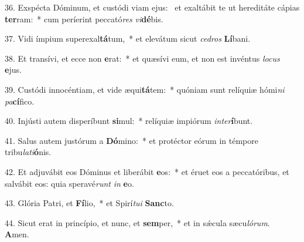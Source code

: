 36. Exspécta Dóminum, et custódi viam ejus: \dag\  et exaltábit te ut hereditáte cápias \textbf{ter}ram:~*  cum períerint peccató\textit{res} \textit{vi}\textbf{dé}bis.\

37. Vidi ímpium superexal\textbf{tá}tum,~*  et elevátum sicut \textit{ce}\textit{dros} \textbf{Lí}bani.\

38. Et transívi, et ecce non \textbf{e}rat:~*  et quæsívi eum, et non est invéntus \textit{lo}\textit{cus} \textbf{e}jus.\

39. Custódi innocéntiam, et vide æqui\textbf{tá}tem:~*  quóniam sunt relíquiæ hómi\textit{ni} \textit{pa}\textbf{cí}fico.\

40. Injústi autem disperíbunt \textbf{si}mul:~*  relíquiæ impiórum \textit{in}\textit{ter}\textbf{í}bunt.\

41. Salus autem justórum a \textbf{Dó}mino:~*  et protéctor eórum in témpore tribu\textit{la}\textit{ti}\textbf{ó}nis.\

42. Et adjuvábit eos Dóminus et liberábit \textbf{e}os:~*  et éruet eos a peccatóribus, et salvábit eos: quia speravé\textit{runt} \textit{in} \textbf{e}o.\

43. Glória Patri, et \textbf{Fí}lio,~*  et Spirí\textit{tu}\textit{i} \textbf{Sanc}to.\

44. Sicut erat in princípio, et nunc, et \textbf{sem}per,~*  et in sǽcula sæcu\textit{ló}\textit{rum}. \textbf{A}men.\

